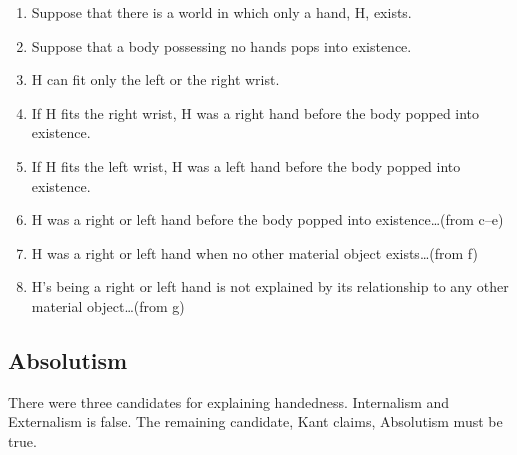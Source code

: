 \documentclass[oneside]{article}
\begin{document}
\begin{enumerate}

\item
  Suppose that there is a world in which only a hand, H, exists.
\item
  Suppose that a body possessing no hands pops into existence.
\item
  H can fit only the left or the right wrist.
\item
  If H fits the right wrist, H was a right hand before the body popped
  into existence.
\item
  If H fits the left wrist, H was a left hand before the body popped
  into existence.
\item
  H was a right or left hand before the body popped into
  existence\ldots{}(from c--e)
\item
  H was a right or left hand when no other material object
  exists\ldots{}(from f)
\item
  H's being a right or left hand is not explained by its relationship to
  any other material object\ldots{}(from g)
\end{enumerate}

\subsection*{Absolutism}\label{absolutism}

There were three candidates for explaining handedness. Internalism and
Externalism is false. The remaining candidate, Kant claims, Absolutism
must be true.
\end{document}
